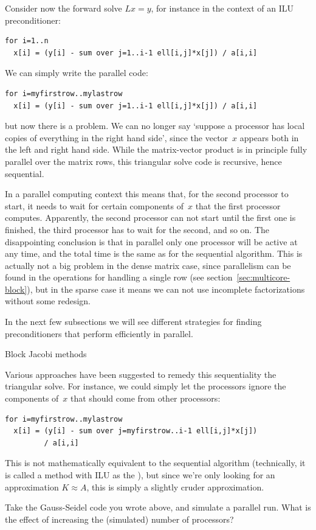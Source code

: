 Consider now the forward solve $Lx=y$, for instance in the context of
an \ac{ILU} preconditioner:
\begin{verbatim}
for i=1..n
  x[i] = (y[i] - sum over j=1..i-1 ell[i,j]*x[j]) / a[i,i]
\end{verbatim}
We can simply write the parallel code:
\begin{verbatim}
for i=myfirstrow..mylastrow
  x[i] = (y[i] - sum over j=1..i-1 ell[i,j]*x[j]) / a[i,i]
\end{verbatim}
but now there is a problem. We can no longer say `suppose a processor
has local copies of everything in the right hand side', since the
vector~$x$ appears both in the left and right hand side. While the
matrix-vector product is in principle fully parallel over the matrix
rows, this triangular solve code is recursive, hence sequential.

In a parallel computing context this means that, for the second
processor to start, it needs to wait for certain components of~$x$
that the first processor computes. Apparently, the second processor
can not start until the first one is finished, the third processor has
to wait for the second, and so on. The disappointing conclusion is
that in parallel only one processor will be active at any time, and
the total time is the same as for the sequential algorithm. This is
actually not a big problem in the dense matrix case, since parallelism
can be found in the operations for handling a single row (see
section~\ref{sec:multicore-block}), but in the sparse case it means we
can not use incomplete factorizations without some redesign.

In the next few subsections we will see different strategies for
finding preconditioners that perform efficiently in parallel.

 {Block Jacobi methods}
\label{sec:block-jacobi}

Various approaches have been suggested to remedy this sequentiality
the triangular solve. For instance, we could simply let the processors
ignore the components of~$x$ that should come from other processors:
\begin{verbatim}
for i=myfirstrow..mylastrow
  x[i] = (y[i] - sum over j=myfirstrow..i-1 ell[i,j]*x[j]) 
         / a[i,i]
\end{verbatim}
This is not mathematically equivalent to the sequential algorithm
(technically, it is called a  method with 
\ac{ILU} as the ), but
since we're only looking for an approximation $K\approx A$, this is
simply a slightly cruder approximation.
\begin{exercise}
  Take the Gauss-Seidel code you wrote above, and simulate a parallel
  run. What is the effect of increasing the (simulated) number of processors?
\end{exercise}

